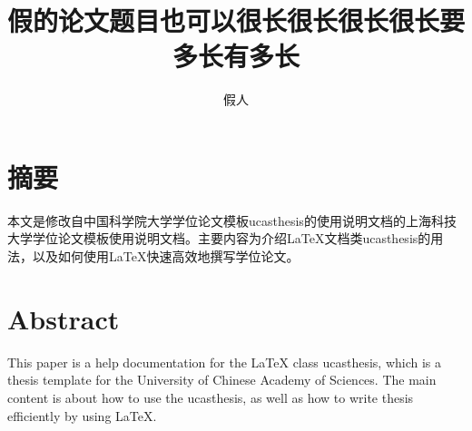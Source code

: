 \confidential{}%
\title{假的论文题目也可以很长很长很长很长要多长有多长}%
\author{假人}%
\advisorsec{}%
\englishdate{\quad / \quad /\quad}%

\chapter*{摘\quad 要}%
\setcounter{page}{1}%

本文是修改自中国科学院大学学位论文模板ucasthesis的使用说明文档的上海科技大学学位论文模板使用说明文档。主要内容为介绍\LaTeX{}文档类ucasthesis的用法，以及如何使用\LaTeX{}快速高效地撰写学位论文。

\chapter*{Abstract}%

This paper is a help documentation for the \LaTeX{} class ucasthesis, which is  a thesis template for the University of Chinese Academy of Sciences. The main content is about how to use the ucasthesis, as well as how to write thesis efficiently by using \LaTeX{}.

